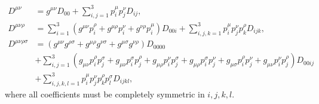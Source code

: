 \begin{subequations}
\begin{align}
                D^{\mu\nu}           & = g^{\mu\nu} D_{00} + \sum_{i,j=1}^{3} p_i^\mu p_j^\nu D_{ij},                                                                                                                                                         \\
                D^{\mu\nu\rho}       & = \sum_{i=1}^3 (g^{\mu\nu} p_i^{\rho} + g^{\mu\rho} p_i^{\nu} + g^{\nu\rho} p_i^{\mu}) D_{00i} + \sum_{i,j,k=1}^3 p_i^\mu p_j^\nu p_k^\rho D_{ijk},                                                                    \\
                \nonumber
                D^{\mu\nu\rho\sigma} & = (g^{\mu\nu}g^{\rho\sigma} + g^{\mu\rho}g^{\nu\sigma} + g^{\mu\sigma}g^{\nu\rho})D_{0000}                                                                                                                             \\
                \nonumber
                                     & + \sum_{i,j=1}^3 (g_{\mu\nu}p_i^\rho p_j^\sigma + g_{\mu\nu}p_i^\sigma p_j^\rho + g_{\mu\rho}p_i^\nu p_j^\sigma + g_{\mu\rho}p_i^\sigma p_j^\nu + g_{\mu\sigma}p_i^\rho p_j^\nu + g_{\mu\nu}p_i^\nu p_j^\rho) D_{00ij} \\
                                     & + \sum_{i,j,k,l=1}^3 p_i^\mu p_j^\nu p_k^\rho p_l^\sigma D_{ijkl},
            \end{align}
        \end{subequations}
        where all coefficients must be completely symmetric in \(i,j,k,l\).

